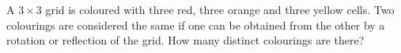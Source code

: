 A $3\times3$ grid is coloured with three red, three orange and three yellow cells. Two colourings are considered the same if one can be obtained from the other by a rotation or reflection of the grid. How many distinct colourings are there?
